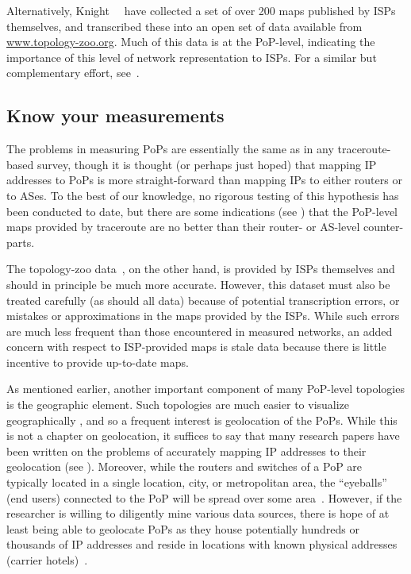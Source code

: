 Alternatively, Knight~\etal~\cite{Zoo} have collected a set of over 
200 maps published by ISPs themselves, and transcribed these into an open 
set of data available from \url{www.topology-zoo.org}. Much of this data is 
at the PoP-level, indicating the importance of this level of network 
representation to ISPs. For a similar but complementary effort, see~\cite{atlas}.
 
\subsection{Know your measurements}

The problems in measuring PoPs are essentially the same as in any
traceroute-based survey, though it is thought (or perhaps just hoped)
that mapping IP addresses to PoPs is more straight-forward than
mapping IPs to either routers or to ASes. To the best of our
knowledge, no rigorous testing of this hypothesis has been conducted
to date, but there are some indications (\eg see \cite{Zoo}) that the
PoP-level maps provided by traceroute are no better than their router-
or AS-level counter-parts.

The topology-zoo data~\cite{Zoo}, on the other hand, is provided by
ISPs themselves and should in principle be much more accurate.
However, this dataset must also be treated carefully (as should all
data) because of potential transcription errors, or mistakes or
approximations in the maps provided by the ISPs. While such errors are
much less frequent than those encountered in measured networks, an
added concern with respect to ISP-provided maps is stale data because
there is little incentive to provide up-to-date maps.

As mentioned earlier, another important component of many PoP-level
topologies is the geographic element. Such topologies are much easier
to visualize geographically \cite{knight12:_i}, and so a frequent
interest is geolocation of the PoPs. While this is not a chapter on
geolocation, it suffices to say that many research papers have been
written on the problems of accurately mapping IP addresses to their
geolocation (\eg see \cite{Poese:2011:IGD:1971162.1971171}). Moreover,
while the routers and switches of a PoP are typically located in a
single location, city, or metropolitan area, the ``eyeballs'' (\ie end
users) connected to the PoP will be spread over some
area~\cite{rasti10:_eyebal_ases}.  However, if the researcher is
willing to diligently mine various data sources, there is hope of at
least being able to geolocate PoPs as they house potentially hundreds
or thousands of IP addresses and reside in locations with known
physical addresses (\eg carrier hotels)~\cite{atlas}.


